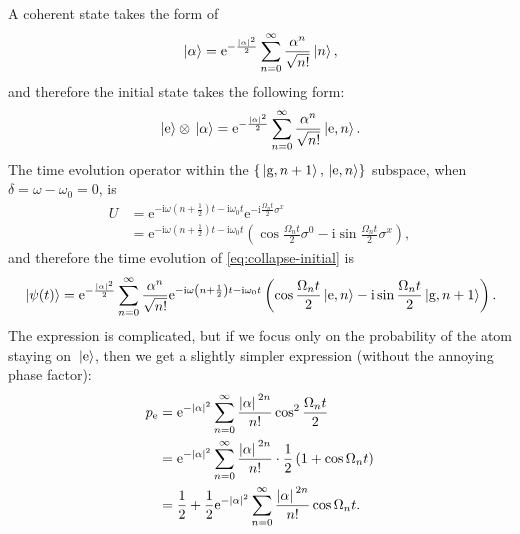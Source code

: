 \documentclass[hyperref, a4paper]{article}
\newcommand*{\ii}{\mathrm{i}}
\newcommand*{\ee}{\mathrm{e}}
\newcommand*{\kete}{\ket*{\text{e}}}
\newcommand*{\pope}{p_{\text{e}}}
\begin{document}
A coherent state takes the form of 
\begin{equation}
    \ket*{\alpha} = \ee^{- \frac{\abs*{\alpha}^2}{2}} \sum_{n=0}^{\infty} \frac{\alpha^n}{\sqrt{n!}} \ket*{n},
\end{equation}
and therefore the initial state takes the following form:
\begin{equation}
    \kete \otimes \ket*{\alpha} = \ee^{- \frac{\abs*{\alpha}^2}{2}} \sum_{n=0}^{\infty} \frac{\alpha^n}{\sqrt{n!}} \ket*{\text{e}, n}.
    \label{eq:collapse-initial}
\end{equation}
The time evolution operator within the $\{ \ket*{\text{g}, n+1}, \ket*{\text{e},n} \}$ subspace, 
when $\delta = \omega - \omega_0 = 0$, is 
\begin{equation}
    \begin{aligned}
        U &= \ee^{- \ii \omega \left( n + \frac{1}{2} \right) t - \ii \omega_0 t} \ee^{- \ii \frac{\Omega_n t}{2} \sigma^x } \\
        &=  \ee^{- \ii \omega \left( n + \frac{1}{2} \right) t - \ii \omega_0 t}
        \left( \cos \frac{\Omega_n t}{2} \sigma^0 - \ii \sin \frac{\Omega_n t}{2} \sigma^x \right),
    \end{aligned}
\end{equation}
and therefore the time evolution of \eqref{eq:collapse-initial} is 
\begin{equation}
    \ket*{\psi(t)} = \ee^{- \frac{\abs*{\alpha}^2}{2}} \sum_{n=0}^{\infty} \frac{\alpha^n}{\sqrt{n!}} 
    \ee^{- \ii \omega \left( n + \frac{1}{2} \right) t - \ii \omega_0 t}
    \left(  \cos \frac{\Omega_n t}{2} \ket*{\text{e}, n} - \ii \sin \frac{\Omega_n t}{2} \ket*{\text{g}, n+1} \right) .
\end{equation}
The expression is complicated, but if we focus only on the probability of the atom staying on $\kete$,
then we get a slightly simpler expression (without the annoying phase factor):
\begin{equation}
    \begin{aligned}
        \pope &= \ee^{- \abs*{\alpha}^2} \sum_{n=0}^{\infty} \frac{\abs*{\alpha}^{2n}}{n!} 
        \cos^2 \frac{\Omega_n t}{2} \\
        &= \ee^{- \abs*{\alpha}^2} \sum_{n=0}^{\infty} \frac{\abs*{\alpha}^{2n}}{n!} 
        \cdot \frac{1}{2} \left( 1 + \cos \Omega_n t \right) \\
        &= \frac{1}{2} + \frac{1}{2} \ee^{- \abs*{\alpha}^2} \sum_{n=0}^{\infty} \frac{\abs*{\alpha}^{2n}}{n!} \cos \Omega_n t.
    \end{aligned}
\end{equation}
\end{document}
